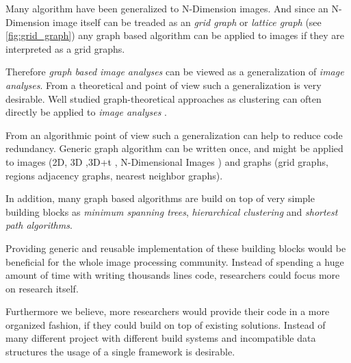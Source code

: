 Many algorithm have been generalized to N-Dimension images.
And since an N-Dimension image itself can be treaded as an \emph{grid graph} or \emph{lattice graph} (see \cref{fig:grid_graph}) any graph based algorithm can be applied to images if they are interpreted as a grid graphs.

Therefore \emph{graph based image analyses} can be viewed as a generalization of \emph{image analyses}.
From a theoretical and  point of view such a generalization is very desirable.
Well studied graph-theoretical approaches as clustering can often directly be applied 
to  \emph{image analyses} \cite{vlachos_1993_csv,arbelaez_2006_cvpr,ohlander_1978_cgip}.

From an algorithmic point of view such a generalization can help to reduce 
code redundancy.
Generic graph algorithm can be written once, and might be applied 
to images (2D, 3D ,3D+t , N-Dimensional Images ) and graphs (grid graphs, 
regions adjacency graphs, nearest neighbor graphs).

In addition, many graph based algorithms are build on top of
very simple building blocks 
as \emph{minimum spanning trees}, \emph{hierarchical clustering} and 
\emph{shortest path algorithms}. 

Providing generic and reusable implementation of these building blocks
would be beneficial for the whole image processing community.
Instead of spending a huge amount of time with writing thousands lines code,
researchers could focus more on research itself.

Furthermore we believe, more researchers would provide their code in a more organized fashion, if 
they could build on top of existing solutions.
Instead of many different project with different build systems and incompatible data structures
the usage of a single framework is desirable.







